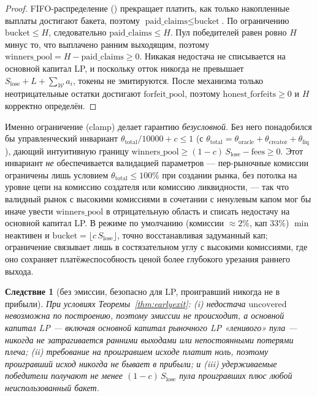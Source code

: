 \documentclass{ledger}
\theoremstyle{plain}
\newtheorem{corollary}{Следствие}
\theoremstyle{remark}
\begin{document}
\begin{proof}
FIFO-распределение () прекращает платить, как только
накопленные выплаты достигают бакета, поэтому $\text{paid\_claims} \le
\text{bucket}$. По ограничению $\text{bucket} \le H$, следовательно
$\text{paid\_claims} \le H$. Пул победителей равен ровно $H$ минус то, что выплачено
ранним выходящим, поэтому $\text{winners\_pool} = H - \text{paid\_claims} \ge 0$.
Никакая недостача не списывается на основной капитал LP, и поскольку отток никогда
не превышает $S_{\text{lose}} + L + \sum_{\mathcal{W}} a_i$, токены не эмитируются.
После механизма  только неотрицательные остатки достигают
$\text{forfeit\_pool}$, поэтому $\text{honest\_forfeits} \ge 0$ и $H$ корректно
определён.
\end{proof}

Именно ограничение (clamp) делает гарантию \emph{безусловной}. Без него
понадобился бы управленческий инвариант $\theta_{\text{total}}/10000 + c \le 1$ (с
$\theta_{\text{total}} = \theta_{\text{oracle}} + \theta_{\text{creator}} +
\theta_{\text{liq}}$), дающий интуитивную границу $\text{winners\_pool} \ge
(1-c)\,S_{\text{lose}} - \text{fees} \ge 0$. Этот инвариант \emph{не} обеспечивается
валидацией параметров --- пер-рыночные комиссии ограничены лишь условием
$\theta_{\text{total}} \le 100\%$ при создании рынка, без потолка на уровне цепи на
комиссию создателя или комиссию ликвидности, --- так что валидный рынок с высокими
комиссиями в сочетании с ненулевым капом мог бы иначе увести $\text{winners\_pool}$
в отрицательную область и списать недостачу на основной капитал LP. В режиме по
умолчанию (комиссии $\approx 2\%$, кап $33\%$) $\min$ неактивен и $\text{bucket} =
\lfloor c\,S_{\text{lose}}\rfloor$, точно восстанавливая задуманный кап; ограничение
связывает лишь в состязательном углу с высокими комиссиями, где оно сохраняет
платёжеспособность ценой более глубокого урезания раннего выхода.

\begin{corollary}[без эмиссии, безопасно для LP, проигравший никогда не в прибыли]
При условиях Теоремы~\ref{thm:earlyexit}: (i) недостача $\text{uncovered}$
невозможна по построению, поэтому эмиссии не происходит, а основной капитал LP ---
включая основной капитал рыночного LP «ленивого» пула --- никогда не затрагивается
ранними выходами или непостоянными потерями плеча; (ii) требование на
\emph{проигравшем} исходе платит ноль, поэтому проигравший исход никогда не бывает в
прибыли; и (iii) удерживаемые победители получают не менее $(1-c)\,S_{\text{lose}}$
пула проигравших плюс любой неиспользованный бакет.
\end{corollary}
\end{document}
